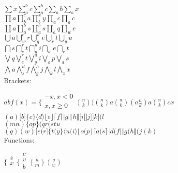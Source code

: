 \documentclass[12pt, a4paper]{article}
\begin{document}
$\sum{x}\sum_{a}^{b}{c}\sum_{a}^{b}{c}\sum_{a
}{b}\sum_{a}{x}$\\


$\prod{a}\prod_{b}^{c}{a}\prod_{b}^{x}{y}\prod
_{a}{c}\prod_{a}{c}$\\


$\coprod{a}\coprod_{a}^{b}{s}\coprod_{a}^{c}{s}
\coprod_{a}{q}\coprod_{w}{e}$\\


$\bigcup{a}\bigcup_{w}^{e}{r}\bigcup_{q}^{w}{e}
\bigcup_{r}{t}\bigcup_{y}{u}$\\


$\bigcap{s}\bigcap_{e}^{r}{t}\bigcap_{y}^{u}{i}
\bigcap_{w}{e}\bigcap_{r}{t}$\\


$\bigvee{q}\bigvee_{e}^{r}{t}\bigvee_{y}^{u}{i}
\bigvee_{o}{p}\bigvee_{a}{s}$\\


$\bigwedge{a}\bigwedge_{s}^{d}{f}\bigwedge_{g}^{h}
{j}\bigwedge_{k}{l}\bigwedge_{z}{x}$\\


Brackets:

$ab f(x)=\bigg\{ 
\begin{gathered}
-x, x<0 \\
x, x\ge 0 \\
\end{gathered}
\binom{n}{k}(\binom{n}{k}a\binom{n}{k}(a\frac{n}{k
})a\binom{n}{k}cx$\\


$(a)\lbrack b\rbrack \lbrace c\rbrace \langle d\rangle \lfloor e
\rfloor \lceil f\rceil \vert g\vert \Vert h\Vert \lbrack i\lbrack 
\rbrack j\rbrack \rbrack k\lbrack (l$\\


$(mn)\lbrace op\rbrace (qr(stu$\\


$(q)(w)\lbrack e(r\rbrack \lbrace t(y\rbrace \langle u(i
\rangle \lfloor o(p\rfloor \lceil a(s\rceil \vert d(f\vert 
\Vert g(h\Vert (j(k)$\\


Functions:

$\bigg\{ 
\begin{gathered}
z \\
x \\
\end{gathered}
\bigg\{ 
\begin{gathered}
c \\
v \\
b \\
\end{gathered}
\binom{n}{m}\binom{q}{w}$\\
\end{document}
